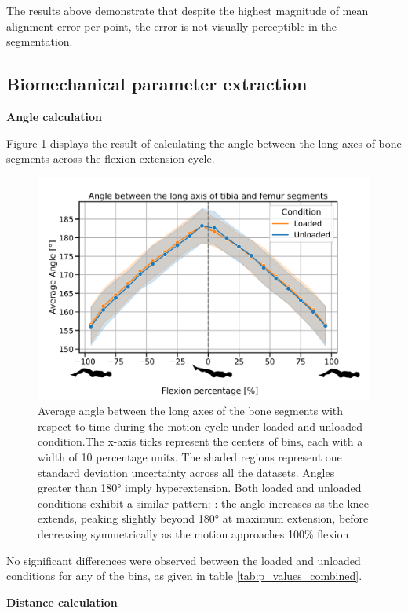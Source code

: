\documentclass{micro-econ-thesis}
\begin{document}
The results above demonstrate that despite the highest magnitude of mean alignment error per point, the error is not visually perceptible in the segmentation.   

\subsection{Biomechanical parameter extraction}

\textbf{Angle calculation}

Figure \ref{fig:anglegraphstickman} displays the result of calculating the angle between the long axes of bone segments across the flexion-extension cycle. 
 
\begin{figure}[H]
	\centering
	\includegraphics[width=0.7\linewidth]{angle_no_13_stick}
	\caption{Average angle between the long axes of the bone segments with respect to time during the motion cycle under loaded and unloaded condition.The x-axis ticks represent the centers of bins, each with a width of 10 percentage units. The shaded regions represent one standard deviation uncertainty across all the datasets. Angles greater than 180° imply hyperextension. Both loaded and unloaded conditions exhibit a similar pattern: : the angle increases as the knee extends, peaking slightly beyond 180° at maximum extension, before decreasing symmetrically as the motion approaches 100\% flexion}
	\label{fig:anglegraphstickman}
\end{figure}

No significant differences were observed between the loaded and unloaded conditions for any of the bins, as given in table \ref{tab:p_values_combined}. 

\textbf{Distance calculation }
\end{document}
